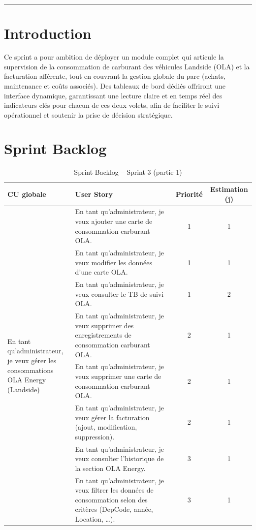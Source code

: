 \documentclass[a4paper,11pt]{report}
\begin{document}
\noindent
\textcolor{gray!70}{\rule{\textwidth}{0.4pt}}


\newpage
\setcounter{section}{0}

\section{Introduction}
Ce sprint a pour ambition de déployer un module complet qui articule la supervision de la consommation de carburant des véhicules Landside (OLA) et la facturation afférente, tout en couvrant la gestion globale du parc (achats, maintenance et coûts associés). Des tableaux de bord dédiés offriront une interface dynamique, garantissant une lecture claire et en temps réel des indicateurs clés pour chacun de ces deux volets, afin de faciliter le suivi opérationnel et soutenir la prise de décision stratégique.







\section{Sprint Backlog}

\begin{table}[htbp]
  \centering
  \caption{Sprint Backlog – Sprint 3 (partie 1)}
  \label{tab:sprint3-backlog-part1}
  \begin{tabular}{|p{3.5cm}|p{8cm}|c|c|}
    \hline
    \textbf{CU globale} 
      & \textbf{User Story} 
      & \textbf{Priorité} 
      & \textbf{Estimation (j)} \\ 
    \hline
    \multirow{8}{=}{\parbox{3.5cm}{En tant qu’administrateur,\\je veux gérer les consommations\\OLA Energy (Landside)}} 
      & En tant qu'administrateur, je veux ajouter une carte de consommation carburant OLA. 
      & 1 & 1 \\ \cline{2-4}
    & En tant qu'administrateur, je veux modifier les données d’une carte OLA. 
      & 1 & 1 \\ \cline{2-4}
    & En tant qu'administrateur, je veux consulter le TB de suivi OLA. 
      & 1 & 2 \\ \cline{2-4}
    & En tant qu'administrateur, je veux supprimer des enregistrements de consommation carburant OLA. 
      & 2 & 1 \\ \cline{2-4}
    & En tant qu'administrateur, je veux supprimer une carte de consommation carburant OLA. 
      & 2 & 1 \\ \cline{2-4}
    & En tant qu'administrateur, je veux gérer la facturation (ajout, modification, suppression). 
      & 2 & 1 \\ \cline{2-4}
    & En tant qu'administrateur, je veux consulter l’historique de la section OLA Energy. 
      & 3 & 1 \\ \cline{2-4}
    & En tant qu'administrateur, je veux filtrer les données de consommation selon des critères (DepCode, année, Location, …). 
      & 3 & 1 \\
    \hline
  \end{tabular}
\end{table}
\newpage
\end{document}
